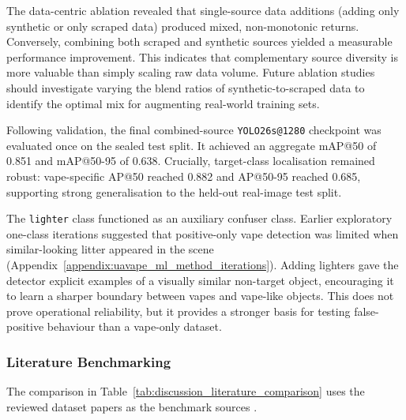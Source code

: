 The data-centric ablation revealed that single-source data additions (adding only synthetic or only scraped data) produced mixed, non-monotonic returns. Conversely, combining both scraped and synthetic sources yielded a measurable performance improvement. This indicates that complementary source diversity is more valuable than simply scaling raw data volume. Future ablation studies should investigate varying the blend ratios of synthetic-to-scraped data to identify the optimal mix for augmenting real-world training sets.

Following validation, the final combined-source \texttt{YOLO26s@1280} checkpoint was evaluated once on the sealed test split. It achieved an aggregate mAP@50 of 0.851 and mAP@50-95 of 0.638. Crucially, target-class localisation remained robust: vape-specific AP@50 reached 0.882 and AP@50-95 reached 0.685, supporting strong generalisation to the held-out real-image test split.

The \texttt{lighter} class functioned as an auxiliary confuser class. Earlier exploratory one-class iterations suggested that positive-only vape detection was limited when similar-looking litter appeared in the scene (Appendix~\ref{appendix:uavape_ml_method_iterations}). Adding lighters gave the detector explicit examples of a visually similar non-target object, encouraging it to learn a sharper boundary between vapes and vape-like objects. This does not prove operational reliability, but it provides a stronger basis for testing false-positive behaviour than a vape-only dataset.

\subsubsection{Literature Benchmarking}

The comparison in Table~\ref{tab:discussion_literature_comparison} uses the reviewed dataset papers as the benchmark sources \cite{trashnet_github,proenca2020taco,wang2020mjuwaste,cordova2022litter,bashkirova2021zerowaste,wang2018bottle,kraft2021uavvaste,liao2023automatic,pisani2024soda}.

